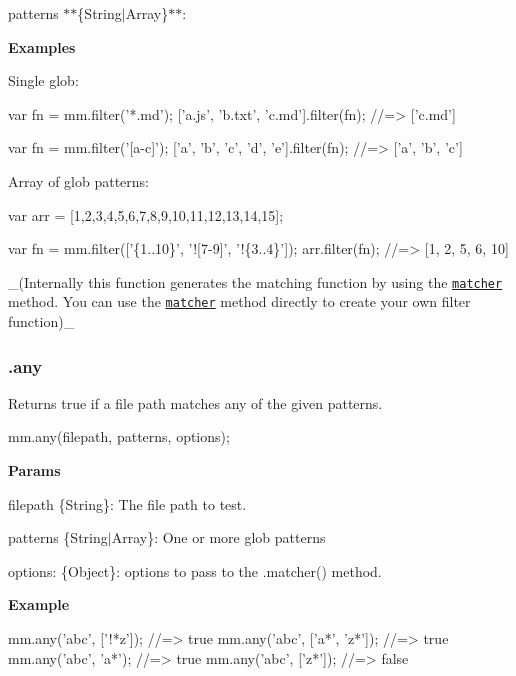 \begin{DoxyItemize}
\item {\ttfamily patterns} $\ast$$\ast$\{String$\vert$\+Array\}$\ast$$\ast$\+:
\end{DoxyItemize}

{\bfseries Examples}

Single glob\+:


\begin{DoxyCode}
var fn = mm.filter('*.md');
['a.js', 'b.txt', 'c.md'].filter(fn);
//=> ['c.md']

var fn = mm.filter('[a-c]');
['a', 'b', 'c', 'd', 'e'].filter(fn);
//=> ['a', 'b', 'c']
\end{DoxyCode}


Array of glob patterns\+:


\begin{DoxyCode}
var arr = [1,2,3,4,5,6,7,8,9,10,11,12,13,14,15];

var fn = mm.filter(['\{1..10\}', '![7-9]', '!\{3..4\}']);
arr.filter(fn);
//=> [1, 2, 5, 6, 10]
\end{DoxyCode}


\+\_\+(Internally this function generates the matching function by using the \href{#matcher}{\tt matcher} method. You can use the \href{#matcher}{\tt matcher} method directly to create your own filter function)\+\_\+

\subsubsection*{.any}

Returns true if a file path matches any of the given patterns.


\begin{DoxyCode}
mm.any(filepath, patterns, options);
\end{DoxyCode}


{\bfseries Params}


\begin{DoxyItemize}
\item filepath {\ttfamily \{String\}}\+: The file path to test.
\item patterns {\ttfamily \{String$\vert$\+Array\}}\+: One or more glob patterns
\item options\+: {\ttfamily \{Object\}}\+: options to pass to the {\ttfamily .matcher()} method.
\end{DoxyItemize}

{\bfseries Example}


\begin{DoxyCode}
mm.any('abc', ['!*z']);
//=> true
mm.any('abc', ['a*', 'z*']);
//=> true
mm.any('abc', 'a*');
//=> true
mm.any('abc', ['z*']);
//=> false
\end{DoxyCode}


